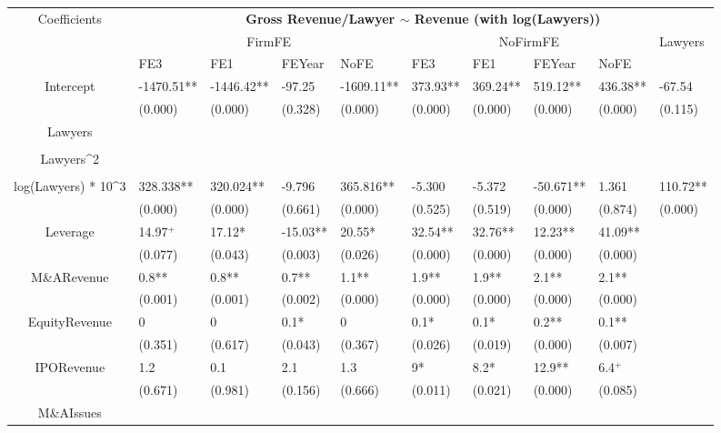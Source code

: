 \documentclass{article}
\begin{document}
\begin{table}[H]
\centering
\begin{tabular}{|clllllllll|}
\hline
\multirow{3}{*}{Coefficients} & \multicolumn{9}{c|}{\textbf{Gross Revenue/Lawyer $\sim$ Revenue (with log(Lawyers))}} \\
\cline{2-10}
& \multicolumn{4}{c}{FirmFE} & \multicolumn{4}{c}{NoFirmFE} & \multirow{2}{*}{Lawyers} \\
\cline{2-9}
& FE3 & FE1 & FEYear & NoFE & FE3 & FE1 & FEYear & NoFE &  \\
\hline
 
Intercept & -1470.51** & -1446.42** & -97.25 & -1609.11** & 373.93** & 369.24** & 519.12** & 436.38** & -67.54 \\ 
   & (0.000) & (0.000) & (0.328) & (0.000) & (0.000) & (0.000) & (0.000) & (0.000) & (0.115) \\ 
  Lawyers &  &  &  &  &  &  &  &  &  \\ 
   &  &  &  &  &  &  &  &  &  \\ 
  Lawyers^2 &  &  &  &  &  &  &  &  &  \\ 
   &  &  &  &  &  &  &  &  &  \\ 
  log(Lawyers) * 10^3 & 328.338** & 320.024** & -9.796 & 365.816** & -5.300 & -5.372 & -50.671** & 1.361 & 110.72** \\ 
   & (0.000) & (0.000) & (0.661) & (0.000) & (0.525) & (0.519) & (0.000) & (0.874) & (0.000) \\ 
  Leverage & 14.97$^{+}$ & 17.12* & -15.03** & 20.55* & 32.54** & 32.76** & 12.23** & 41.09** &  \\ 
   & (0.077) & (0.043) & (0.003) & (0.026) & (0.000) & (0.000) & (0.000) & (0.000) &  \\ 
  M\&ARevenue & 0.8** & 0.8** & 0.7** & 1.1** & 1.9** & 1.9** & 2.1** & 2.1** &  \\ 
   & (0.001) & (0.001) & (0.002) & (0.000) & (0.000) & (0.000) & (0.000) & (0.000) &  \\ 
  EquityRevenue & 0 & 0 & 0.1* & 0 & 0.1* & 0.1* & 0.2** & 0.1** &  \\ 
   & (0.351) & (0.617) & (0.043) & (0.367) & (0.026) & (0.019) & (0.000) & (0.007) &  \\ 
  IPORevenue & 1.2 & 0.1 & 2.1 & 1.3 & 9* & 8.2* & 12.9** & 6.4$^{+}$ &  \\ 
   & (0.671) & (0.981) & (0.156) & (0.666) & (0.011) & (0.021) & (0.000) & (0.085) &  \\ 
  M\&AIssues &  &  &  &  &  &  &  &  &  \\ 

\end{tabular}
\end{table}
\end{document}
